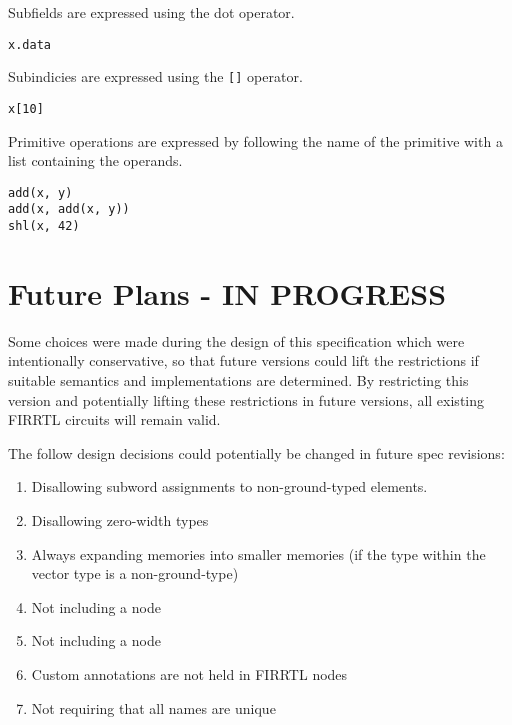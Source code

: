 \documentclass[12pt]{article}
\begin{document}
Subfields are expressed using the dot operator.
\begin{verbatim}
x.data
\end{verbatim}

Subindicies are expressed using the \verb|[]| operator.
\begin{verbatim}
x[10]
\end{verbatim}

Primitive operations are expressed by following the name of the primitive with a list containing the operands. 
\begin{verbatim}
add(x, y)
add(x, add(x, y))
shl(x, 42)
\end{verbatim}

\section{Future Plans - IN PROGRESS}
Some choices were made during the design of this specification which were intentionally conservative, so that future versions could lift the restrictions if suitable semantics and implementations are determined.
By restricting this version and potentially lifting these restrictions in future versions, all existing FIRRTL circuits will remain valid.

The follow design decisions could potentially be changed in future spec revisions:
\begin{enumerate}[topsep=3pt,itemsep=-0.5ex,partopsep=1ex,parsep=1ex]
\item Disallowing subword assignments to non-ground-typed elements.
\item Disallowing zero-width types
\item Always expanding memories into smaller memories (if the type within the vector type is a non-ground-type)
\item Not including a  node
\item Not including a  node
\item Custom annotations are not held in FIRRTL nodes
\item Not requiring that all names are unique
\end{enumerate}
\end{document}
